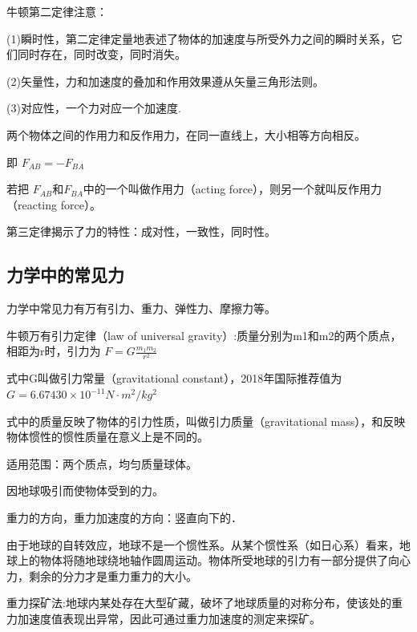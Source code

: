 	\begin{note}
	牛顿第二定律注意：
	
	(1)瞬时性，第二定律定量地表述了物体的加速度与所受外力之间的瞬时关系，它们同时存在，同时改变，同时消失。
	
	(2)矢量性，力和加速度的叠加和作用效果遵从矢量三角形法则。
	
	(3)对应性，一个力对应一个加速度.
	\end{note}
	
	\begin{definition}[牛顿第三定律]两个物体之间的作用力和反作用力，在同一直线上，大小相等方向相反。


即
$ F_{ A B } = - F_{ B A }  $

若把
$F _ { AB } \text{和} F _ { BA }$中的一个叫做作用力（acting force），则另一个就叫反作用力（reacting force）。

第三定律揭示了力的特性：成对性，一致性，同时性。
\end{definition}
\subsection{力学中的常见力}

力学中常见力有万有引力、重力、弹性力、摩擦力等。

\begin{definition}[万有引力]
	
	
	牛顿万有引力定律（law of universal gravity）:质量分别为m1和m2的两个质点，相距为r时，引力为
	$ F = G \frac { m _ { 1 } m _ { 2 } } { r ^ { 2 } } $
	
	式中G叫做引力常量（gravitational constant），2018年国际推荐值为
	$ G = 6 . 6 7 4 3 0 \times 1 0 ^ { - 1 1 } N \cdot m ^ { 2 } / k g ^ { 2 } $
\end{definition}

式中的质量反映了物体的引力性质，叫做引力质量（gravitational mass），和反映物体惯性的惯性质量在意义上是不同的。

适用范围：两个质点，均匀质量球体。


\begin{definition}[重力]因地球吸引而使物体受到的力。\end{definition}


重力的方向，重力加速度的方向：竖直向下的．\\[0.01cm]

{\small	由于地球的自转效应，地球不是一个惯性系。从某个惯性系（如日心系）看来，地球上的物体将随地球绕地轴作圆周运动。物体所受地球的引力有一部分提供了向心力，剩余的分力才是重力重力的大小。
	
	重力探矿法:地球内某处存在大型矿藏，破坏了地球质量的对称分布，使该处的重力加速度值表现出异常，因此可通过重力加速度的测定来探矿。}\\[0.01cm]



